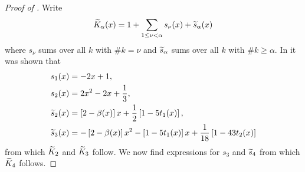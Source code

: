 \documentclass[acmsmall]{acmart}
\begin{document}
\begin{proof}[Proof of ]
    Write  
    $${\widetilde{K}}_\alpha(x) = 1 + \sum_{1 \leq \nu < \alpha} s_\nu(x) + {\widetilde{s}}_\alpha(x)$$ 
    where $s_\nu$ sums over all $k$ with $\#k = \nu$ and ${\widetilde{s}}_\alpha$ sums over all $k$ with $\#k \geq \alpha$. In \citep[Corollary 1]{baldeaux.polylat_efficient_comp_worse_case_error_cbc} it was shown that 
    \begin{align*}
        s_1(x) &= -2x+1, \\
        s_2(x) &= 2x^2 - 2x + \frac{1}{3}, \\
        {\widetilde{s}}_2(x) &=  \left[2-\beta(x)\right]x + \frac{1}{2}\left[1-5t_1(x)\right], \\
        {\widetilde{s}}_3(x) &= -\left[2-\beta(x)\right] x^2 - \left[1-5t_1(x)\right]x + \frac{1}{18}\left[1-43t_2(x)\right]
    \end{align*}
    from which ${\widetilde{K}}_2$ and ${\widetilde{K}}_3$ follow. We now find expressions for $s_3$ and ${\widetilde{s}}_4$ from which ${\widetilde{K}}_4$ follows. 


\end{proof}
\end{document}

